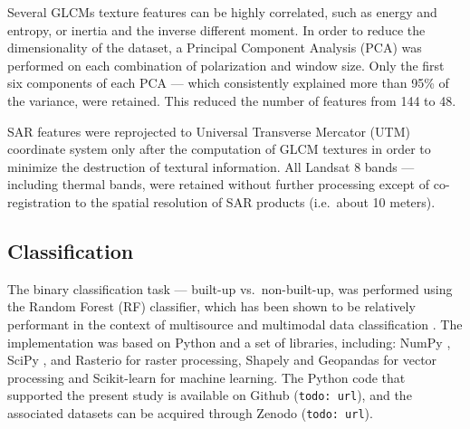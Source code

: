 \documentclass[remotesensing,article,submit,moreauthors,pdftex,10pt,a4paper]{Definitions/mdpi}
\begin{document}
Several GLCMs texture features can be highly correlated, such as energy and
entropy, or inertia and the inverse different moment. In order to reduce the
dimensionality of the dataset, a Principal Component Analysis (PCA) was
performed on each combination of polarization and window size. Only the first
six components of each PCA --- which consistently explained more than 95\% of
the variance, were retained. This reduced the number of features from 144 to 48.

SAR features were reprojected to Universal Transverse Mercator (UTM) coordinate
system only after the computation of GLCM textures in order to minimize the
destruction of textural information. All Landsat 8 bands --- including thermal
bands, were retained without further processing except of co-registration to the
spatial resolution of SAR products (i.e.~about 10 meters).

\subsection{Classification}

The binary classification task --- built-up vs.~non-built-up, was
performed using the Random Forest (RF) classifier, which has been shown
to be relatively performant in the context of multisource and multimodal
data classification \cite{Pal2005, Gislason2006, Belgiu2016}. The
implementation was based on Python and a set of libraries, including:
NumPy \cite{Oliphant2007}, SciPy \cite{Oliphant2007}, and Rasterio
\cite{Gillies2013} for raster processing, Shapely \cite{Gillies2007}
and Geopandas for vector processing and Scikit-learn \cite{Pedregosa2011} for
machine learning. The Python code that supported the present study is available
on Github (\texttt{todo:\ url}), and the associated datasets can be acquired
through Zenodo (\texttt{todo:\ url}).
\end{document}
